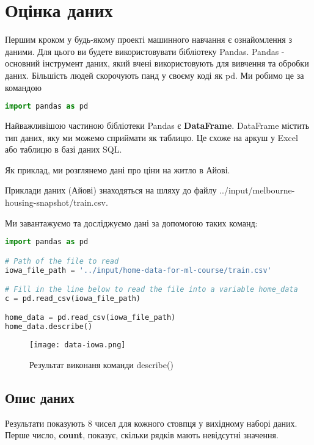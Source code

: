 \chapter{Оцінка даних}\label{cha:basic_data_exploration}
Першим кроком у будь-якому проекті машинного навчання є ознайомлення з даними.
Для цього ви будете використовувати бібліотеку Pandas.
Pandas - основний інструмент даних, який вчені використовують для вивчення та обробки даних.
Більшість людей скорочують панд у своєму коді як pd.
Ми робимо це за командою

\begin{lstlisting}[style=light, language=Python,label={lst:vectorimg},caption=Імпортування Pandas]
import pandas as pd
\end{lstlisting}

Найважливішою частиною бібліотеки Pandas є \textbf{DataFrame}.
DataFrame містить тип даних, яку ми можемо сприймати як таблицю.
Це схоже на аркуш у Excel або таблицю в базі даних SQL.

Як приклад, ми розглянемо дані про ціни на житло в Айові.

Приклади даних (Айові) знаходяться на шляху до файлу ../input/melbourne-housing-snapshot/train.csv.

Ми завантажуємо та досліджуємо дані за допомогою таких команд:

\begin{lstlisting}[style=light, language=Python,label={lst:vectorimg},caption=Імпортування Pandas]
import pandas as pd

# Path of the file to read
iowa_file_path = '../input/home-data-for-ml-course/train.csv'

# Fill in the line below to read the file into a variable home_data
c = pd.read_csv(iowa_file_path)

home_data = pd.read_csv(iowa_file_path)
home_data.describe()

\end{lstlisting}

\begin{figure}
    \label{fig:data_iowa}
    \texttt{[image: data-iowa.png]}

    Результат виконаня команди describe()
\end{figure}

\section{Опис даних}\label{sec:data_description}
Результати показують 8 чисел для кожного стовпця у вихідному наборі даних.
Перше число, \textbf{count}, показує, скільки рядків мають невідсутні значення.

